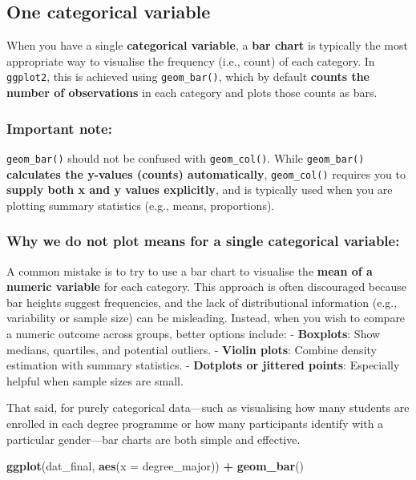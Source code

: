 \documentclass[
  oneside]{book}
\newenvironment{Shaded}{\begin{snugshade}}{\end{snugshade}}
\newcommand{\AttributeTok}[1]{\textcolor[rgb]{0.13,0.29,0.53}{#1}}
\newcommand{\FunctionTok}[1]{\textcolor[rgb]{0.13,0.29,0.53}{\textbf{#1}}}
\newcommand{\NormalTok}[1]{#1}
\newcommand{\SpecialCharTok}[1]{\textcolor[rgb]{0.81,0.36,0.00}{\textbf{#1}}}
\begin{document}
\subsection{One categorical variable}\label{one-categorical-variable}

When you have a single \textbf{categorical variable}, a \textbf{bar chart} is typically the most appropriate way to visualise the frequency (i.e., count) of each category. In \texttt{ggplot2}, this is achieved using \texttt{geom\_bar()}, which by default \textbf{counts the number of observations} in each category and plots those counts as bars.

\subsubsection{Important note:}\label{important-note}

\texttt{geom\_bar()} should not be confused with \texttt{geom\_col()}. While \texttt{geom\_bar()} \textbf{calculates the y-values (counts) automatically}, \texttt{geom\_col()} requires you to \textbf{supply both x and y values explicitly}, and is typically used when you are plotting summary statistics (e.g., means, proportions).

\subsubsection{Why we do not plot means for a single categorical variable:}\label{why-we-do-not-plot-means-for-a-single-categorical-variable}

A common mistake is to try to use a bar chart to visualise the \textbf{mean of a numeric variable} for each category. This approach is often discouraged because bar heights suggest frequencies, and the lack of distributional information (e.g., variability or sample size) can be misleading. Instead, when you wish to compare a numeric outcome across groups, better options include:
- \textbf{Boxplots}: Show medians, quartiles, and potential outliers.
- \textbf{Violin plots}: Combine density estimation with summary statistics.
- \textbf{Dotplots or jittered points}: Especially helpful when sample sizes are small.

That said, for purely categorical data---such as visualising how many students are enrolled in each degree programme or how many participants identify with a particular gender---bar charts are both simple and effective.

\begin{Shaded}
\begin{Highlighting}[]
\FunctionTok{ggplot}\NormalTok{(dat\_final, }\FunctionTok{aes}\NormalTok{(}\AttributeTok{x =}\NormalTok{ degree\_major)) }\SpecialCharTok{+}
  \FunctionTok{geom\_bar}\NormalTok{()}
\end{Highlighting}
\end{Shaded}
\end{document}
